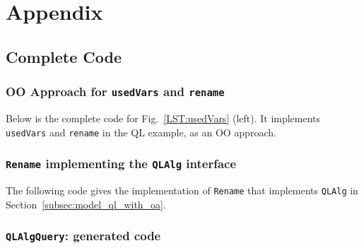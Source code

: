 \clearpage

\section{Appendix}\label{sec:appendix}

\balance

\subsection{Complete Code}

\subsubsection{OO Approach for \lstinline{usedVars} and \lstinline{rename}}\label{subsec:appendix_code_oo_approach}

Below is the complete code for Fig.~\ref{LST:usedVars} (left). It implements \lstinline{usedVars} and \lstinline{rename} in the QL example, as an OO approach.


\subsubsection{\lstinline{Rename} implementing the \lstinline{QLAlg} interface}\label{subsec:appendix_code_rename}

The following code gives the implementation of \lstinline{Rename} that implements \lstinline{QLAlg} in Section~\ref{subsec:model_ql_with_oa}.


\begin{comment}
\subsubsection{\lstinline{SetMonoid}}\label{subsec:appendix_code_setmonoid}

The implementation of \lstinline{SetMonoid} for Fig.~\ref{ql_with_oaframework} and Section~\ref{subsec:solvingfreevars}.

\end{comment}

\subsubsection{\lstinline{QLAlgQuery}: generated code}\label{subsec:appendix_code_qlalgquery}

